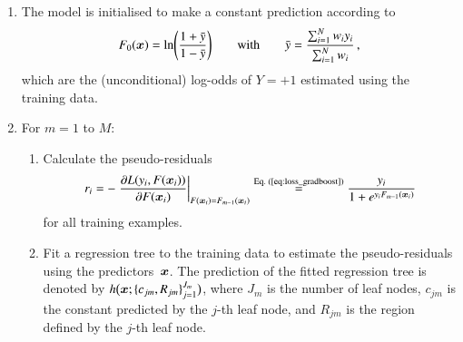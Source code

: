 \begin{enumerate}[itemsep=2pt]

\item The model is initialised to make a constant prediction according to
  \begin{align*}
    F_0(\bm{x}) = \ln\mathopen{}\left( \frac{1 + \bar{y}}{1 - \bar{y}}
    \right)\mathclose{}
    \qquad \text{with} \qquad
    \bar{y} = \frac{\sum_{i=1}^{N} w_i y_i}{\sum_{i=1}^{N} w_i} \,\text{,}
  \end{align*}
  which are the (unconditional) log-odds of $Y = +1$ estimated using the
  training data.

\item For $m = 1$ to $M$:
  \begin{enumerate}[itemsep=2pt]

  \item Calculate the pseudo-residuals
    \begin{align*}
      r_i
      = - \left. \frac{\partial L(y_i, F(\bm{x}_i))}
      {\partial F(\bm{x}_i)}\right|_{F(\bm{x}_i) = F_{m - 1}(\bm{x}_i)}
      \overset{\text{Eq.\ (\ref{eq:loss_gradboost})}}{=}
      \frac{y_i}{1 + e^{y_i F_{m-1}(\bm{x}_i)}}
    \end{align*}
    for all training examples.

  \item Fit a regression tree to the training data to estimate the
    pseudo-residuals using the predictors~$\bm{x}$. The prediction of the
    fitted regression tree is denoted by
    $h\bigl( \bm{x}; \{c_{jm}, R_{jm}\}_{j=1}^{J_{m}} \bigr)$, where $J_{m}$
    is the number of leaf nodes, $c_{jm}$ is the constant predicted by the
    $j$-th leaf node, and $R_{jm}$ is the region defined by the $j$-th leaf
    node.


\end{enumerate}
\end{enumerate}
